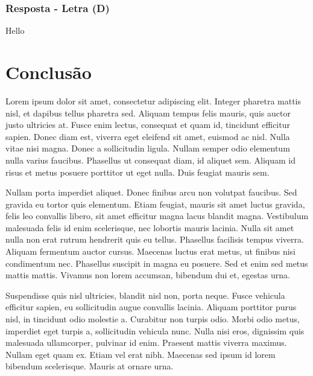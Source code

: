 \documentclass[12pt, a4paper]{article}
\begin{document}
		\subsubsection{Resposta - Letra (D)}
			Hello

\section{Conclusão}
Lorem ipsum dolor sit amet, consectetur adipiscing elit. Integer pharetra mattis nisl, et dapibus tellus pharetra sed. Aliquam tempus felis mauris, quis auctor justo ultricies at. Fusce enim lectus, consequat et quam id, tincidunt efficitur sapien. Donec diam est, viverra eget eleifend sit amet, euismod ac nisl. Nulla vitae nisi magna. Donec a sollicitudin ligula. Nullam semper odio elementum nulla varius faucibus. Phasellus ut consequat diam, id aliquet sem. Aliquam id risus et metus posuere porttitor ut eget nulla. Duis feugiat mauris sem.

Nullam porta imperdiet aliquet. Donec finibus arcu non volutpat faucibus. Sed gravida eu tortor quis elementum. Etiam feugiat, mauris sit amet luctus gravida, felis leo convallis libero, sit amet efficitur magna lacus blandit magna. Vestibulum malesuada felis id enim scelerisque, nec lobortis mauris lacinia. Nulla sit amet nulla non erat rutrum hendrerit quis eu tellus. Phasellus facilisis tempus viverra. Aliquam fermentum auctor cursus. Maecenas luctus erat metus, ut finibus nisi condimentum nec. Phasellus suscipit in magna eu posuere. Sed et enim sed metus mattis mattis. Vivamus non lorem accumsan, bibendum dui et, egestas urna.

Suspendisse quis nisl ultricies, blandit nisl non, porta neque. Fusce vehicula efficitur sapien, eu sollicitudin augue convallis lacinia. Aliquam porttitor purus nisl, in tincidunt odio molestie a. Curabitur non turpis odio. Morbi odio metus, imperdiet eget turpis a, sollicitudin vehicula nunc. Nulla nisi eros, dignissim quis malesuada ullamcorper, pulvinar id enim. Praesent mattis viverra maximus. Nullam eget quam ex. Etiam vel erat nibh. Maecenas sed ipsum id lorem bibendum scelerisque. Mauris at ornare urna.
\end{document}
